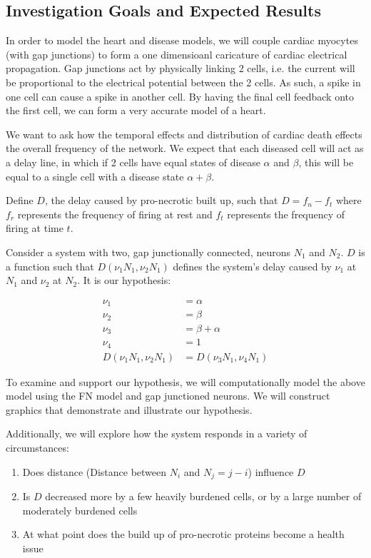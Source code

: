 \documentclass[11pt]{article}
\begin{document}
\subsection{Investigation Goals and Expected Results}

In order to model the heart and disease models, we will couple cardiac myocytes (with gap junctions) to form a one dimensioanl caricature of cardiac electrical propagation. Gap junctions act by physically linking 2 cells, i.e. the current will be proportional to the electrical potential between the 2 cells. As such, a spike in one cell can cause a spike in another cell. By having the final cell feedback onto the first cell, we can form a very accurate model of a heart.

We want to ask how the temporal effects and distribution of cardiac death effects the overall frequency of the network. We expect that each diseased cell will act as a delay line, in which if 2 cells have equal states of disease $\alpha$ and $\beta$, this will be equal to a single cell with a disease state $\alpha+\beta$. 

Define $D$, the delay caused by pro-necrotic built up, such that $D=f_n - f_t$ where $f_r$ represents the frequency of firing at rest and $f_t$ represents the frequency of firing at time $t$. 

Consider a system with two, gap junctionally connected, neurons $N_1$ and $N_2$. $D$ is a function such that $D(\nu_1 N_1, \nu_2 N_1)$ defines the system's delay caused by $\nu_1$ at $N_1$ and $\nu_2$ at $N_2$. It is our hypothesis: 

$$ \begin{aligned} \nu_1 &= \alpha \\ \nu_2 &= \beta \\ \nu_3 &= \beta + \alpha \\ \nu_4 &= 1 \\ D(\nu_1 N_1, \nu_2 N_1) &= D(\nu_3 N_1, \nu_4 N_1) \end{aligned} $$ 

To examine and support our hypothesis, we will computationally model the above model using the FN model and gap junctioned neurons. We will construct graphics that demonstrate and illustrate our hypothesis.

Additionally, we will explore how the system responds in a variety of circumstances:

\begin{enumerate}
	\item Does distance (Distance between $N_i$ and $N_j= j -i$) influence $D$
	\item Is $D$ decreased more by a few heavily burdened cells, or by a large number of moderately burdened cells
	\item At what point does the build up of pro-necrotic proteins become a health issue
\end{enumerate}
\end{document}
